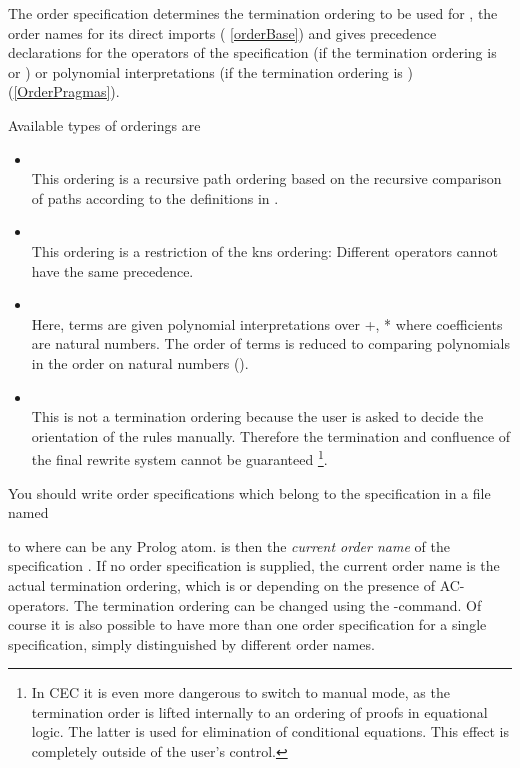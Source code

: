 {\noindent
The order specification determines the termination ordering to be used for 
, the order names for its direct imports (
\ref{orderBase}) and gives precedence declarations for the operators of the
specification (if the termination ordering is  or ) or
polynomial interpretations (if the termination ordering is )
( \ref{OrderPragmas}).

Available types of orderings are
\begin{itemize}
\item {} \\
This ordering is a recursive path ordering based on the recursive comparison of paths
according to the definitions in \cite{KNS85}.
\item {} \\
This ordering is a restriction of the kns ordering:
Different operators cannot have the same precedence.
\item {}\\
Here, terms are given polynomial interpretations over +, * where
coefficients are natural numbers.
The order of terms is reduced to comparing polynomials in the order on natural
numbers (\cite{CL86}).
\item {}\\
This is not a termination ordering because the user is asked to decide the
orientation of the rules manually. Therefore the termination and confluence of the
final rewrite system cannot be guaranteed
\footnote[1]{In CEC it is even more dangerous to switch to manual mode, as
the termination order is lifted internally to an ordering of proofs in
equational logic. The latter is used for elimination of conditional 
equations. This effect is completely outside of the user's control.}.
\end{itemize}

\noindent You should write order specifications which belong to the
specification  in a file named 

\hbox to  
\noindent where  can be any Prolog atom.
 is then the {\em current order name} of the specification
. If no order specification is supplied, the current
order name is the actual termination ordering, which is  or
 depending on the presence of AC-operators. 
The termination ordering can be changed using the -command.  Of
course it is also possible to have more than one order specification for a
single specification, simply distinguished by different order names.



}
